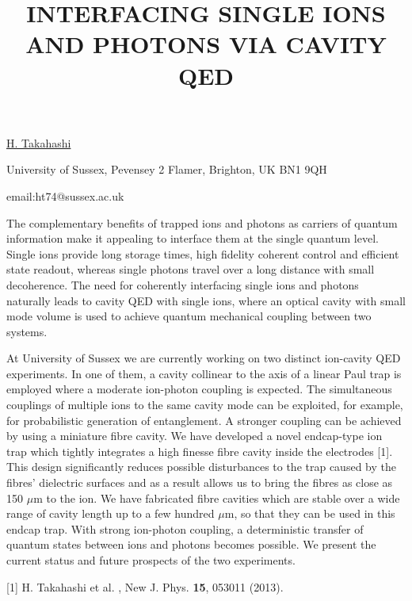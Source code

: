 \title{INTERFACING SINGLE IONS AND PHOTONS VIA CAVITY QED}

\underline{H. Takahashi} 

{\normalsize{\vspace{-4mm}
University of Sussex, Pevensey 2 Flamer, Brighton, UK BN1 9QH

\email email:ht74@sussex.ac.uk}}

The complementary benefits of trapped ions and photons as carriers of quantum information make it appealing to interface them at the single quantum level. Single ions provide long storage times, high fidelity coherent control and efficient state readout, whereas single photons travel over a long distance with small decoherence.  The need for coherently interfacing single ions and photons naturally leads to cavity QED with single ions, where an optical cavity with small mode volume is used to achieve quantum mechanical coupling between two systems.

At University of Sussex we are currently working on two distinct ion-cavity QED experiments. In one of them, a cavity collinear to the axis of a linear Paul trap is employed where a moderate ion-photon coupling is expected. The simultaneous couplings of multiple ions to the same cavity mode can be exploited, for example, for probabilistic generation of entanglement. A stronger coupling can be achieved by using a miniature fibre cavity. We have developed a novel endcap-type ion trap which tightly integrates a high finesse fibre cavity inside the electrodes [1]. This design significantly reduces possible disturbances to the trap caused by the fibres’ dielectric surfaces and as a result allows us to bring the fibres as close as 150 $\mu$m to the ion. We have fabricated fibre cavities which are stable over a wide range of cavity length up to a few hundred $\mu$m, so that they can be used in this endcap trap.  With strong ion-photon coupling, a deterministic transfer of quantum states between ions and photons becomes possible. We present the current status and future prospects of the two experiments.


{\normalsize
[1] H. Takahashi et al. , New J. Phys. \textbf{15}, 053011 (2013).
}

\vspace{\baselineskip}
